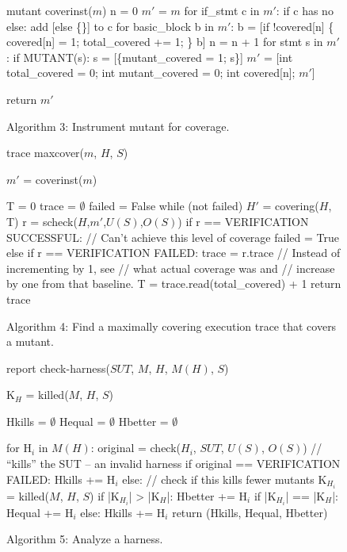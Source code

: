 \documentclass[conference]{IEEEtran}
\begin{document}
\begin{figure}
{\scriptsize 
\begin{code}
mutant coverinst($m$) 
\vspace{0.1in}
n = 0
$m'$ = $m$
for if\_stmt c in $m'$:
   if c has no else:
      add [else \{\}] to c
for basic\_block b in $m'$:
   b = [if !covered[n] \{
           covered[n] = 1;
           total\_covered += 1;
        \}
        b]
   n = n + 1
for stmt s in $m'$:
   if MUTANT(s):
      s = [\{mutant\_covered = 1;
            s\}]
$m'$ = [int total\_covered = 0;
      int mutant\_covered = 0;
      int covered[n];
      $m'$]

return $m'$
\end{code}
}
\caption{Algorithm 3: Instrument mutant for coverage.}
\label{alg:covermut}
\end{figure}

\begin{figure}
{\scriptsize 
\begin{code}
trace maxcover($m$, $H$, $S$) 
\vspace{0.1in}

$m'$ = coverinst($m$)

T = 0
trace = $\emptyset$
failed = False
while (not failed)
   $H'$ = covering($H$, T)
   r = scheck($H$,$m'$,$U(S)$,$O(S)$)
   if r == VERIFICATION SUCCESSFUL:
     // Can't achieve this level of coverage
     failed = True
   else if r == VERIFICATION FAILED:
     trace = r.trace
     // Instead of incrementing by 1, see
     // what actual coverage was and
     // increase by one from that baseline.
     T = trace.read(total\_covered) + 1
return trace
\end{code}
}
\caption{Algorithm 4: Find a maximally covering execution trace that
  covers a mutant.}
\label{alg:maxcover}
\end{figure}

\begin{figure}
{\scriptsize 
\begin{code}
report check-harness($SUT$, $M$, $H$, $M(H)$, $S$) 
\vspace{0.1in}

K$_H$ = killed($M$, $H$, $S$) 

Hkills = $\emptyset$
Hequal = $\emptyset$
Hbetter = $\emptyset$

for H$_i$ in $M(H)$:
   original = check($H_i$, $SUT$, $U(S)$, $O(S)$)
   // ``kills'' the SUT -- an invalid harness
   if original == VERIFICATION FAILED: 
      Hkills += H$_i$
   else: // check if this kills fewer mutants
      K$_{H_i}$ = killed($M$, $H$, $S$)
      if |K$_{H_i}$| > |K$_H$|:
         Hbetter += H$_i$
      if |K$_{H_i}$| == |K$_H$|:
         Hequal += H$_i$
      else:
         Hkills += H$_i$
return (Hkills, Hequal, Hbetter)
\end{code}
}
\caption{Algorithm 5: Analyze a harness.}
\label{alg:checkharness}
\end{figure}
\end{document}
